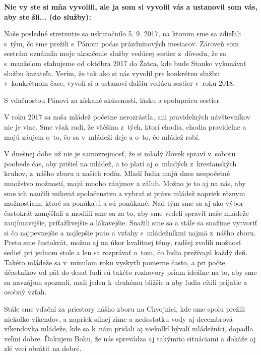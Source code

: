 {\bf Nie vy ste si mňa vyvolili, ale ja som si vyvolil vás a ustanovil som vás, aby ste šli... (do služby):}

Naše posledné stretnutie sa uskutočnilo 5. 9. 2017, na ktorom sme sa zdieľali s~tým, čo sme prežili s~Pánom počas prázdninových mesiacov. Zároveň som sestrám oznámila moje ukončenie služby vedúcej sestier z~dôvodu, že sa s~manželom sťahujeme od októbra 2017 do Žatca, kde bude Stanko vykonávať službu kazateľa. Verím, že tak ako si nás vyvolil pre konkrétnu službu v~konkrétnom čase, vyvolí si a ustanoví ďalšiu vedúcu sestier v~roku 2018.

S vďačnosťou Pánovi za získané skúsenosti, lásku a spoluprácu sestier



V roku 2017 sa naša mládež početne nerozrástla, ani pravidelných návštevníkov nie je viac. Sme však radi, že väčšina z~tých, ktorí chodia, chodia pravidelne a majú záujem o~to, čo sa v~mládeži deje a o~to, čo mládež robí.

V dnešnej dobe už nie je samozrejmosť, že si mladý človek spraví v~sobotu poobede čas, aby prišiel na mládež, a to platí aj o~mladých z~kresťanských kruhov, z~nášho zboru a našich rodín. Mladí ľudia majú dnes nespočetné množstvo možností, majú mnoho záujmov a záľub. Možno je to aj na nás, aby sme ich naučili milovať spoločenstvo a vybrať si práve mládež napriek rôznym možnostiam, ktoré sa ponúkajú a sú ponúkané. Nad tým sme sa aj ako výbor častokrát zamýšľali a modlili sme sa za to, aby sme vedeli spraviť naše mládeže zaujímavejšie, príťažlivejšie a lákavejšie. Snažili sme sa a stále sa snažíme vytvoriť si čo najpevnejšie a najlepšie puto a vzťahy s~mládežníkmi najmä z~nášho zboru. Preto sme častokrát, možno aj na úkor kvalitnej témy, radšej zvolili možnosť sedieť pri jednom stole a len sa rozprávať o~tom, čo ľudia prežívajú každý deň. Takéto mládeže sa v~minulom roku vyskytli pomerne často, a pri počte účastníkov od päť do desať ľudí sú takéto rozhovory priam ideálne na to, aby sme sa navzájom spoznali, mali jeden k~druhému bližšie a aby ľudia cítili prijatie a osobný vzťah.

Stále sme vďační za priestory nášho zboru na Chvojnici, kde sme spolu prežili niekoľko víkendov, a napriek silnej zime a nedostatku vody aj decembrová víkendovka mládeže, kde sa k~nám pridali aj niekoľkí bývalí mládežníci, dopadla veľmi dobre. Ďakujem Bohu, že nás sprevádza aj takýmito situáciami a dokáže aj zlé veci obrátiť na dobré.

